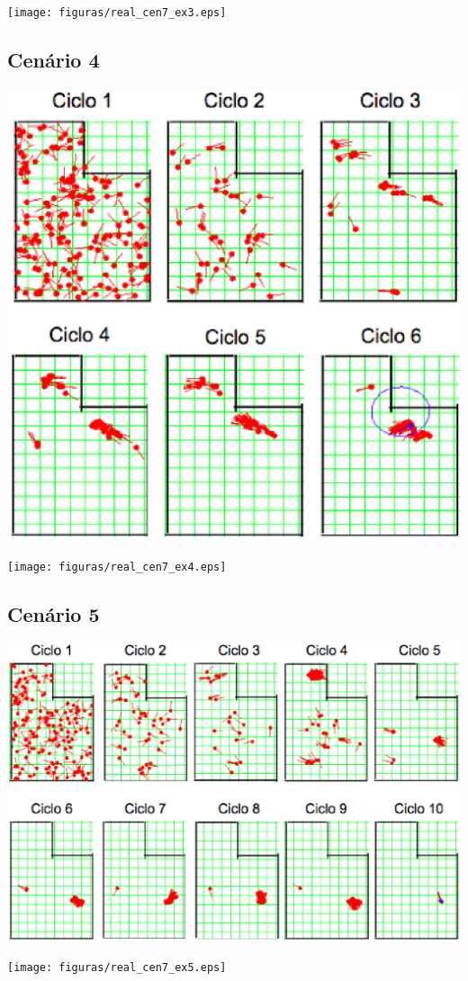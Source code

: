 {\centering
\texttt{[image: figuras/real\_cen7\_ex3.eps]}
\label{img:real_cen7_ex3}
\par}

\subsection{Cenário 4}

{\centering
\includegraphics[scale=0.4]{figuras/cen7_ex4.eps}
\label{img:cen7_ex4}
\par}

{\centering
\texttt{[image: figuras/real\_cen7\_ex4.eps]}
\label{img:real_cen7_ex4}
\par}

\subsection{Cenário 5}

{\centering
\includegraphics[scale=0.4]{figuras/cen7_ex5.eps}
\label{img:cen7_ex5}
\par}

{\centering
\texttt{[image: figuras/real\_cen7\_ex5.eps]}
\label{img:real_cen7_ex5}
\par}
